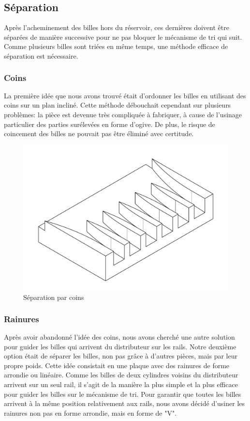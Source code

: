 \subsection{Séparation}
Après l'acheminement des billes hors du réservoir, ces dernières doivent être séparées de manière successive pour ne pas bloquer le mécanisme de tri qui suit. Comme plusieurs billes sont triées en même temps, une méthode efficace de séparation est nécessaire. 

\subsubsection{Coins}
La première idée que nous avons trouvé était d'ordonner les billes en utilisant des coins sur un plan incliné. Cette méthode débouchait cependant sur plusieurs problèmes: la pièce est devenue très compliquée à fabriquer, à cause de l'usinage particulier des parties surélevées en forme d'ogive. De plus, le risque de coincement des billes ne pouvait pas être éliminé avec certitude.

\begin{figure}
    \centering
    \includegraphics[width=\textwidth]{Graphics/Rails/COINS.pdf}
    \caption{Séparation par coins}
\end{figure}

\subsubsection{Rainures}
Après avoir abandonné l'idée des coins, nous avons cherché une autre solution pour guider les billes qui arrivent du distributeur sur les rails. Notre deuxième option était de séparer les billes, non pas grâce à d'autres pièces, mais par leur propre poids. Cette idée consistait en une plaque avec des rainures de forme arrondie ou linéaire. Comme les billes de deux cylindres voisins du distributeur arrivent sur un seul rail, il s'agit de la manière la plus simple et la plus efficace pour guider les billes sur le mécanisme de tri. Pour garantir que toutes les billes arrivent à la même position relativement aux rails, nous avons décidé d'usiner les rainures non pas en forme arrondie, mais en forme de "V".

